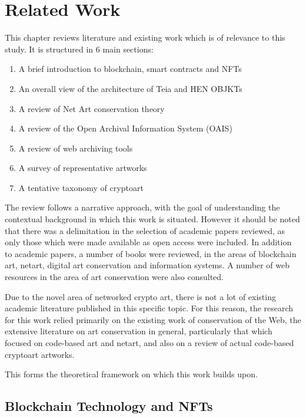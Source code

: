 \chapter{Related Work}
\label{chap:related_work}

This chapter reviews literature and existing work which is of relevance to this study. It is structured in 6 main sections:

\begin{enumerate}
    \item A brief introduction to blockchain, smart contracts and NFTs
    \item An overall view of the architecture of Teia and HEN OBJKTs
    \item A review of Net Art conservation theory
    \item A review of the Open Archival Information System (OAIS)
    \item A review of web archiving tools
    \item A survey of representative artworks
    \item A tentative taxonomy of cryptoart
\end{enumerate}

\vspace{0.5cm}

The review follows a narrative approach, with the goal of understanding the contextual background in which this work is situated. However it should be noted that there was a delimitation in the selection of academic papers reviewed, as only those which were made available as open access were included. In addition to academic papers, a number of books were reviewed, in the areas of blockchain art, netart, digital art conservation and information systems. A number of web resources in the area of art conservation were also consulted. 

Due to the novel area of networked crypto art, there is not a lot of existing academic literature published in this specific topic. For this reason, the research for this work relied primarily on the existing work of conservation of the Web, the extensive literature on art conservation in general, particularly that which focused on code-based art and netart, and also on a review of actual code-based cryptoart artworks.

This forms the theoretical framework on which this work builds upon.


\section{Blockchain Technology and NFTs}


